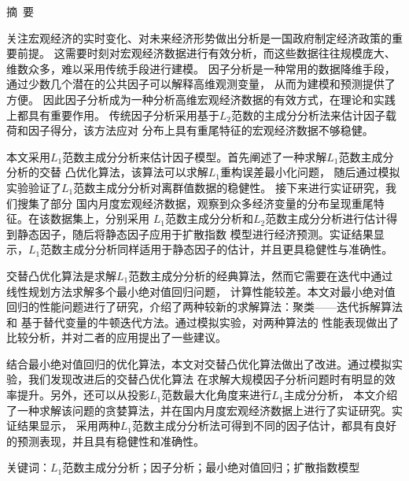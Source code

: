 

\centerline{\large\heiti 摘\ 要}

\vspace{2ex}
关注宏观经济的实时变化、对未来经济形势做出分析是一国政府制定经济政策的重要前提。
这需要时刻对宏观经济数据进行有效分析，而这些数据往往规模庞大、维数众多，难以采用传统手段进行建模。
因子分析是一种常用的数据降维手段，通过少数几个潜在的公共因子可以解释高维观测变量，
从而为建模和预测提供了方便。
因此因子分析成为一种分析高维宏观经济数据的有效方式，在理论和实践上都具有重要作用。
传统因子分析采用基于$L_2$范数的主成分分析法来估计因子载荷和因子得分，该方法应对
分布上具有重尾特征的宏观经济数据不够稳健。

本文采用$L_1$范数主成分分析来估计因子模型。首先阐述了一种求解$L_1$范数主成分分析的交替
凸优化算法，该算法可以求解$L_1$重构误差最小化问题，
随后通过模拟实验验证了$L_1$范数主成分分析对离群值数据的稳健性。
接下来进行实证研究，我们搜集了部分
国内月度宏观经济数据，观察到众多经济变量的分布呈现重尾特征。在该数据集上，分别采用
$L_1$范数主成分分析和$L_2$范数主成分分析进行估计得到静态因子，随后将静态因子应用于扩散指数
模型进行经济预测。实证结果显示，$L_1$范数主成分分析同样适用于静态因子的估计，并且更具稳健性与准确性。

交替凸优化算法是求解$L_1$范数主成分分析的经典算法，然而它需要在迭代中通过线性规划方法求解多个最小绝对值回归问题，
计算性能较差。本文对最小绝对值回归的性能问题进行了研究，介绍了两种较新的求解算法：聚类——迭代拆解算法和
基于替代变量的牛顿迭代方法。通过模拟实验，对两种算法的
性能表现做出了比较分析，并对二者的应用提出了一些建议。

结合最小绝对值回归的优化算法，本文对交替凸优化算法做出了改进。通过模拟实验，我们发现改进后的交替凸优化算法
在求解大规模因子分析问题时有明显的效率提升。另外，还可以从投影$L_1$范数最大化角度来进行$L_1$主成分分析，
本文介绍了一种求解该问题的贪婪算法，并在国内月度宏观经济数据上进行了实证研究。实证结果显示，
采用两种$L_1$范数主成分分析法可得到不同的因子估计，都具有良好的预测表现，并且具有稳健性和准确性。


\vspace{2ex}
{\heiti 关键词}：$L_1$范数主成分分析；因子分析；最小绝对值回归；扩散指数模型
\thispagestyle{plain}

\newpage